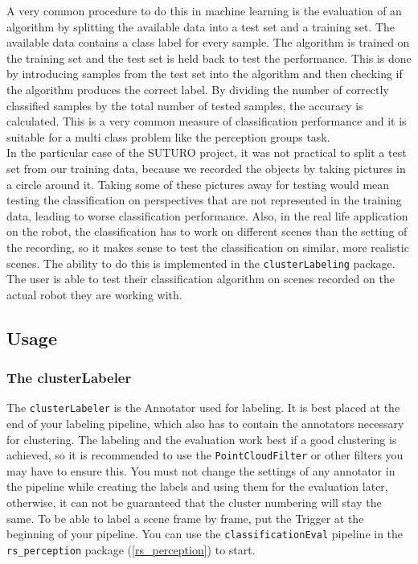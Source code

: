 \documentclass[main.tex]{subfiles}
\begin{document}
A very common procedure to do this in machine learning is the evaluation of an algorithm by splitting the available data into a test set and a training set. The available data contains a class label for every sample. The algorithm is trained on the training set and the test set is held back to test the performance. This is done by introducing samples from the test set into the algorithm and then checking if the algorithm produces the correct label. By dividing the number of correctly classified samples by the total number of tested samples, the accuracy is calculated. This is a very common measure of classification performance and it is suitable for a multi class problem like the perception groups task.\\

In the particular case of the SUTURO project, it was not practical to split a test set from our training data, because we recorded the objects by taking pictures in a circle around it. Taking some of these pictures away for testing would mean testing the classification on perspectives that are not represented in the training data, leading to worse classification performance. Also, in the real life application on the robot, the classification has to work on different scenes than the setting of the recording, so it makes sense to test the classification on similar, more realistic scenes. The ability to do this is implemented in the \texttt{clusterLabeling} package. The user is able to test their classification algorithm on scenes recorded on the actual robot they are working with.  

\subsection{Usage}

\subsubsection{The clusterLabeler}
The \texttt{clusterLabeler} is the Annotator used for labeling. It is best placed at the end of your labeling pipeline, which also has to contain the annotators necessary for clustering. The labeling and the evaluation work best if a good clustering is achieved, so it is recommended to use the \texttt{PointCloudFilter} or other filters you may have to ensure this. You must not change the settings of any annotator in the pipeline while creating the labels and using them for the evaluation later, otherwise, it can not be guaranteed that the cluster numbering will stay the same. To be able to label a scene frame by frame, put the Trigger at the beginning of your pipeline. You can use the \texttt{classificationEval} pipeline in the \texttt{rs\_perception} package (\ref{rs_perception}) to start.\\
\end{document}
